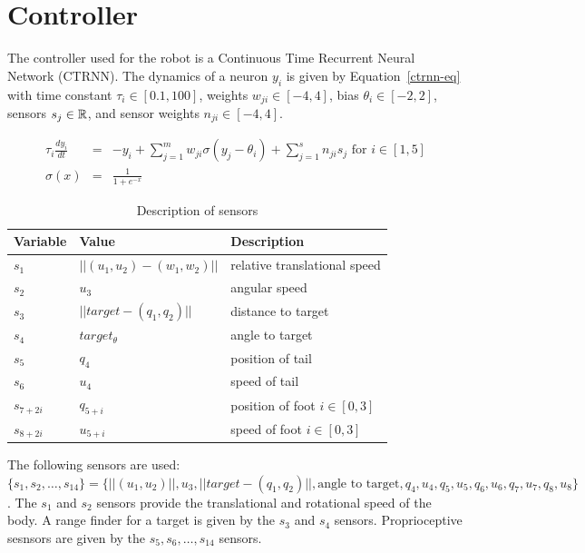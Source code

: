 \section{Controller}

The controller used for the robot is a Continuous Time Recurrent
Neural Network (CTRNN).  The dynamics of a neuron $y_i$ is given by
Equation~\ref{ctrnn-eq} with time constant $\tau_i \in [0.1, 100]$,
weights $w_{ji} \in [-4, 4]$, bias $\theta_i \in [-2, 2]$, sensors
$s_j \in \mathbb{R} $, and sensor weights $n_{ji} \in [-4, 4]$.

\begin{eqnarray}
  \tau_i \frac{d y_i}{dt} &=& -y_i + \sum_{j = 1}^m w_{ji} \sigma(y_j - \theta_i) + \sum_{j=1}^s n_{ji} s_j \text{ for } i \in [1,5] \label{ctrnn-eq} \\
  \sigma(x) &=& \frac{1}{1 + e^{-x}}
\end{eqnarray}

\begin{table}
  \begin{center}
    \begin{tabular}{ | l | l | l | }
      \hline
      Variable & Value & Description \\
      \hline
      $s_1$ & $||(u_1, u_2) - (w_1, w_2)||$ & relative translational speed \\
      $s_2$ & $u_3$ & angular speed \\
      $s_3$ & $||target - (q_1, q_2)||$ & distance to target \\ 
      $s_4$ & $target_\theta$ & angle to target \\              
      $s_5$ & $q_4$ & position of tail \\                       
      $s_6$ & $u_4$ & speed of tail \\                          
      $s_{7 + 2 i}$ & $q_{5 + i}$ & position of foot $i \in [0, 3]$ \\        
      $s_{8 + 2 i}$ & $u_{5 + i}$ & speed of foot $i \in [0, 3]$ \\           
      \hline
    \end{tabular}
  \end{center}
  \caption{Description of sensors}
  \label{table:sensor}
\end{table}

The following sensors are used: $\{s_1, s_2, \ldots, s_{14}\} =
\{||(u_1, u_2)||, u_3, ||target - (q_1, q_2)||, \text{angle to
  target}, q_4, u_4, q_5, u_5, q_6, u_6, q_7, u_7, q_8, u_8\}$.  The
$s_1$ and $s_2$ sensors provide the translational and rotational speed
of the body.  A range finder for a target is given by the $s_3$ and
$s_4$ sensors.  Proprioceptive sesnsors are given by the $s_5, s_6,
\ldots, s_{14}$ sensors.

